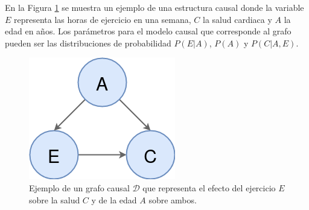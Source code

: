 En la Figura \ref{fig:dag-causal} se muestra un ejemplo de una
estructura causal donde la variable $E$ representa las horas de
ejercicio en una semana, $C$ la salud cardiaca y $A$ la edad en
años. Los parámetros para el modelo causal que corresponde al 
grafo pueden ser las distribuciones de probabilidad $P(E|A)$,
$P(A)$ y $P(C|A, E)$.

\begin{figure}
    \centering
    \includegraphics[scale=0.35]{Chapter2/Figs/example-dag.png}
    \caption{Ejemplo de un grafo causal $\mathcal{D}$ que representa el efecto del ejercicio $E$ sobre la salud $C$ y de la edad $A$ sobre ambos.}
    \label{fig:dag-causal}
\end{figure}
    




